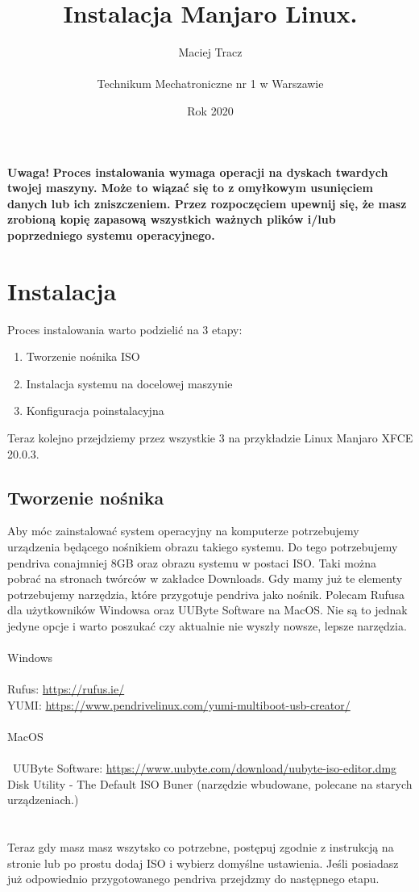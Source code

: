 \documentclass[10pt,a4paper]{article}
\begin{document}
\title{\Huge Instalacja Manjaro Linux.}
\author{Maciej Tracz \\\\Technikum Mechatroniczne nr 1 w Warszawie}
\date{Rok 2020}
\maketitle

\textbf{Uwaga!} \textbf{Proces instalowania wymaga operacji na dyskach twardych twojej maszyny. Może to wiązać się to z omyłkowym usunięciem danych lub ich zniszczeniem. Przez rozpoczęciem upewnij się, że masz zrobioną kopię zapasową wszystkich ważnych plików i/lub poprzedniego systemu operacyjnego.}

	\section{Instalacja}
	
Proces instalowania warto podzielić na 3 etapy:
\begin{enumerate}
\item Tworzenie nośnika ISO
\item Instalacja systemu na docelowej maszynie
\item Konfiguracja poinstalacyjna\\
\end{enumerate}	
Teraz kolejno przejdziemy przez wszystkie 3 na przykładzie Linux Manjaro XFCE 20.0.3.
		\subsection{Tworzenie nośnika}
Aby móc zainstalować system operacyjny na komputerze potrzebujemy urządzenia będącego nośnikiem obrazu takiego systemu. Do tego potrzebujemy pendriva conajmniej 8GB oraz obrazu systemu w postaci ISO. Taki można pobrać na stronach twórców w zakładce Downloads. Gdy mamy już te elementy potrzebujemy narzędzia, które przygotuje pendriva jako nośnik. Polecam Rufusa dla użytkowników Windowsa oraz UUByte Software na MacOS. Nie są to jednak jedyne opcje i warto poszukać czy aktualnie nie wyszły nowsze, lepsze narzędzia.\\\\Windows\\\\Rufus: \url{https://rufus.ie/}\\ YUMI: \url{https://www.pendrivelinux.com/yumi-multiboot-usb-creator/}\\\\MacOS\\\\\ UUByte Software: \url{https://www.uubyte.com/download/uubyte-iso-editor.dmg}\\Disk Utility - The Default ISO Buner (narzędzie wbudowane, polecane na starych urządzeniach.)\\\\\\ Teraz gdy masz masz wszytsko co potrzebne, postępuj zgodnie z instrukcją na stronie lub po prostu dodaj ISO i wybierz domyślne ustawienia. Jeśli posiadasz już odpowiednio przygotowanego pendriva przejdzmy do następnego etapu.
		
\end{document}
